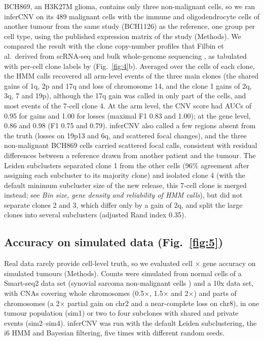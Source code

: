 BCH869, an H3K27M glioma, contains only three non-malignant cells, so we ran inferCNV on its 489 malignant cells with the immune and oligodendrocyte cells of another tumour from the same study (BCH1126) as the reference, one group per cell type, using the published expression matrix of the study (Methods). We compared the result with the clone copy-number profiles that Filbin et al.\ derived from scRNA-seq and bulk whole-genome sequencing \citep{filbin2018}, as tabulated with per-cell clone labels by \citet{huang2024xclone} (Fig.~\ref{fig:4}b). Averaged over the cells of each clone, the HMM calls recovered all arm-level events of the three main clones (the shared gains of 1q, 2p and 17q and loss of chromosome 14, and the clone 1 gains of 2q, 3q, 7 and 19p), although the 17q gain was called in only part of the cells, and most events of the 7-cell clone 4. At the arm level, the CNV score had AUCs of 0.95 for gains and 1.00 for losses (maximal F1 0.83 and 1.00); at the gene level, 0.86 and 0.98 (F1 0.75 and 0.79). inferCNV also called a few regions absent from the truth (losses on 19p13 and 6q, and scattered focal changes), and the three non-malignant BCH869 cells carried scattered focal calls, consistent with residual differences between a reference drawn from another patient and the tumour. The Leiden subclusters separated clone 1 from the other cells (96\% agreement after assigning each subcluster to its majority clone) and isolated clone 4 (with the default minimum subcluster size of the new release, this 7-cell clone is merged instead; see \emph{Bin size, gene density and reliability of HMM calls}), but did not separate clones 2 and 3, which differ only by a gain of 2q, and split the large clones into several subclusters (adjusted Rand index 0.35).

\subsection{Accuracy on simulated data (Fig.~\ref{fig:5})}

Real data rarely provide cell-level truth, so we evaluated cell × gene accuracy on simulated tumours (Methods). Counts were simulated from normal cells of a Smart-seq2 data set (synovial sarcoma non-malignant cells \citep{jerbyarnon2021}) and a 10x data set, with CNAs covering whole chromosomes (0.5×, 1.5× and 2×) and parts of chromosomes (a 2× partial gain on chr2 and a near-complete loss on chr8), in one tumour population (sim1) or two to four subclones with shared and private events (sim2--sim4). inferCNV was run with the default Leiden subclustering, the i6 HMM and Bayesian filtering, five times with different random seeds.

